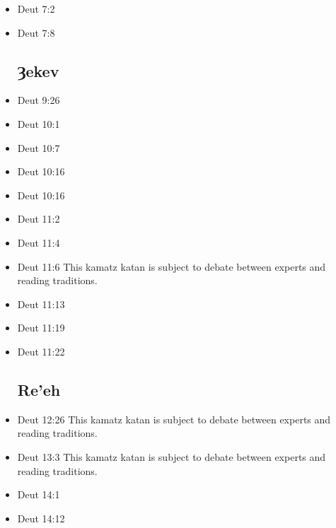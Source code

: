 \documentclass[14pt]{book}
\begin{document}
\begin{multicols}{2}
\begin{itemize}
\item Deut 7:2

\item Deut 7:8

\subsection{Ȝekev}

\item Deut 9:26

\item Deut 10:1

\item Deut 10:7

\item Deut 10:16

\item Deut 10:16

\item Deut 11:2

\item Deut 11:4

\item Deut 11:6 This kamatz katan is subject to debate between experts and reading traditions.

\item Deut 11:13

\item Deut 11:19

\item Deut 11:22

\subsection{Re'eh}

\item Deut 12:26 This kamatz katan is subject to debate between experts and reading traditions.

\item Deut 13:3 This kamatz katan is subject to debate between experts and reading traditions.

\item Deut 14:1

\item Deut 14:12


\end{itemize}
\end{multicols}
\end{document}
